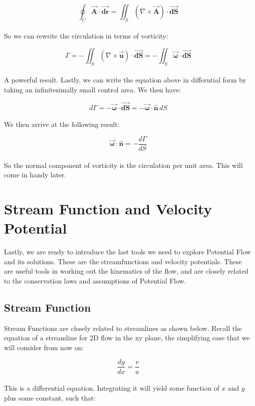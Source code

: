 \documentclass[11pt]{article}
\begin{document}
\begin{equation*}
    \oint_C \vec{\bm{A}} \cdot \vec{\bm{dr}} = \iint_S (\nabla \times \vec{\bm{A}}) \cdot \vec{\bm{dS}}
\end{equation*} \\
\noindent
So we can rewrite the circulation in terms of vorticity:

\begin{equation*}
    \Gamma = -\iint_S (\nabla \times \vec{\bm{u}}) \cdot \vec{\bm{dS}} = -\iint_S \vec{\bm{\omega}} \cdot \vec{\bm{dS}}
\end{equation*} \\
\noindent
A powerful result. Lastly, we can write the equation above in differntial form by taking an infinitesimally small control area. We then have:

\begin{equation*}
    d\Gamma = -\vec{\bm{\omega}}\cdot\vec{\bm{dS}} = -\vec{\bm{\omega}}\cdot\hat{\bm{n}}\,dS
\end{equation*} \\
We then arrive at the following result:

\begin{equation*}
    \vec{\bm{\omega}}\cdot\hat{\bm{n}} = -\frac{d\Gamma}{dS}
\end{equation*} \\
\noindent
So the normal component of vorticity is the circulation per unit area. This will come in handy later.
\pagebreak

\section{Stream Function and Velocity Potential}
Lastly, we are ready to introduce the last tools we need to explore Potential Flow and its solutions. These are the streamfunctions and velocity potentials. These are useful tools in working out the kinematics of the flow, and are closely related to the conservation laws and assumptions of Potential Flow.

\subsection{Stream Function}
Stream Functions are closely related to streamlines as shown below. Recall the equation of a streamline for 2D flow in the xy plane, the simplifying case that we will consider from now on:

\begin{equation*}
    \frac{dy}{dx} = \frac{v}{u}
\end{equation*} \\
\noindent
This is a differential equation. Integrating it will yield some function of $x$ and $y$ plus some constant, such that:
\end{document}
